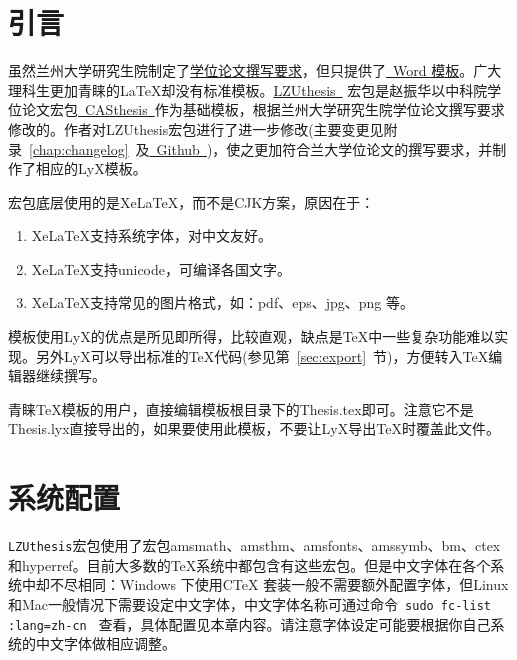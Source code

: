 \documentclass[twoside,longtitle]{LZUthesis}
\begin{document}

\tableofcontents{}


\mainmatter

\pagestyle{lzu}


\chapter{引言\label{chap:intro}}

虽然兰州大学研究生院制定了\href{http://ge.lzu.edu.cn/degree/xwsq/lwgf/201103/1186.htm}{学位论文撰写要求}，但只提供了\href{http://ge.lzu.edu.cn/degree/xwsq/lwgf/201103/1187.htm}{~Word 模板}。广大理科生更加青睐的\LaTeX{}却没有标准模板。\href{http://blog.sciencenet.cn/home.php?mod=space&uid=117412&do=blog&id=512804}{LZUthesis~} 宏包是赵振华以中科院学位论文宏包\href{http://www.ctex.org/PackageCASthesis}{~CASthesis~}作为基础模板，根据兰州大学研究生院学位论文撰写要求修改的。作者对LZUthesis宏包进行了进一步修改(主要变更见附录~\ref{chap:changelog}~及\href{https://github.com/mosesnow/LZUthesis/commits/master}{~Github~})，使之更加符合兰大学位论文的撰写要求，并制作了相应的LyX模板。

宏包底层使用的是Xe\LaTeX{}，而不是CJK方案，原因在于：
\begin{enumerate}
\item Xe\LaTeX{}支持系统字体，对中文友好。
\item Xe\LaTeX{}支持unicode，可编译各国文字。
\item Xe\LaTeX{}支持常见的图片格式，如：pdf、eps、jpg、png 等。
\end{enumerate}


模板使用LyX的优点是所见即所得，比较直观，缺点是\TeX{}中一些复杂功能难以实现。另外LyX可以导出标准的\TeX{}代码(参见第~\ref{sec:export}~节)，方便转入\TeX{}编辑器继续撰写。

青睐\TeX{}模板的用户，直接编辑模板根目录下的Thesis.tex即可。注意它不是Thesis.lyx直接导出的，如果要使用此模板，不要让LyX导出\TeX{}时覆盖此文件。


\chapter{系统配置}

\texttt{LZUthesis}宏包使用了宏包amsmath、amsthm、amsfonts、amssymb、bm、ctex 和hyperref。目前大多数的\TeX{}系统中都包含有这些宏包。但是中文字体在各个系统中却不尽相同：Windows 下使用C\TeX{} 套装一般不需要额外配置字体，但Linux 和Mac一般情况下需要设定中文字体，中文字体名称可通过命令~\lstinline!sudo fc-list :lang=zh-cn!~ 查看，具体配置见本章内容。请注意字体设定可能要根据你自己系统的中文字体做相应调整。
\end{document}
